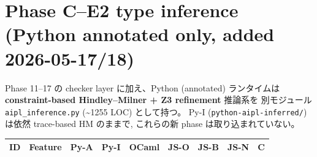 \documentclass[10pt,a4paper,landscape]{article}
\begin{document}
\clearpage

\section*{Phase C--E2 type inference (Python annotated only, added 2026-05-17/18)}

Phase 11--17 の checker layer に加え、Python (annotated) ランタイムは
\textbf{constraint-based Hindley--Milner + Z3 refinement} 推論系を
別モジュール \texttt{aipl\_inference.py} (\textasciitilde 1255 LOC) として持つ。
Py-I (\texttt{python-aipl-inferred/}) は依然 trace-based HM のままで,
これらの新 phase は取り込まれていない。

\begin{longtable}{l F C C C C C C C}
  \toprule
  \textbf{ID} & \textbf{Feature} & \textbf{Py-A} & \textbf{Py-I} & \textbf{OCaml} & \textbf{JS-O} & \textbf{JS-B} & \textbf{JS-N} & \textbf{C} \\
  \midrule
  \endhead


\end{longtable}
\end{document}
